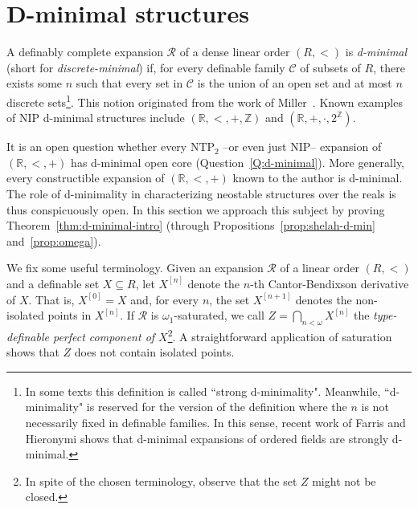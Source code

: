 \documentclass[12pt]{article}
\newcommand{\Cc}{\mathcal{C}}
\newcommand{\Rr}{\mathcal{R}}
\newcommand{\R}{\mathbb{R}}
\newcommand{\Z}{\mathbb{Z}}
\newcommand{\NIP}{\ensuremath{\mathrm{NIP}}}
\newcommand{\NTP}{\ensuremath{\mathrm{NTP}_2}}
\theoremstyle{definition}
\theoremstyle{remark}
\begin{document}
\section{D-minimal structures}\label{sec:d-minimal}


A definably complete expansion $\Rr$ of a dense linear order $(R,<)$ is \emph{d-minimal} (short for \emph{discrete-minimal}) if, for every definable family $\Cc$ of subsets of $R$, there exists some $n$ such that every set in $\Cc$ is the union of an open set and at most $n$ discrete sets\footnote{In some texts this definition is called ``strong d-minimality". Meanwhile, ``d-minimality" is reserved for the version of the definition where the $n$ is not necessarily fixed in definable families. In this sense, recent work of Farris and Hieronymi shows that d-minimal expansions of ordered fields are strongly d-minimal.}. This notion originated from the work of Miller~\cite{miller05-tame}. Known examples of $\NIP$ d-minimal structures include $(\R,<,+,\Z)$ and $(\R,+,\cdot,2^\Z)$.  

It is an open question whether every $\NTP$ --or even just $\NIP$-- expansion of $(\R,<,+)$ has d-minimal open core (Question~\ref{Q:d-minimal}). More generally, every constructible expansion of $(\R,<,+)$ known to the author is d-minimal. The role of d-minimality in characterizing neostable structures over the reals is thus conspicuously open. In this section we approach this subject by proving Theorem~\ref{thm:d-minimal-intro} (through Propositions~\ref{prop:shelah-d-min} and~\ref{prop:omega}). 

We fix some useful terminology. Given an expansion $\Rr$ of a linear order $(R,<)$ and a definable set $X\subseteq R$, let $X^{[n]}$ denote the $n$-th Cantor-Bendixson derivative of $X$. That is, $X^{[0]}=X$ and, for every $n$, the set $X^{[n+1]}$ denotes the non-isolated points in $X^{[n]}$. If $\Rr$ is $\omega_1$-saturated, we call $Z=\bigcap_{n<\omega} X^{[n]}$ the \emph{type-definable perfect component of $X$}\footnote{In spite of the chosen terminology, observe that the set $Z$ might not be closed.}. A straightforward application of saturation shows that $Z$ does not contain isolated points.  
\end{document}
